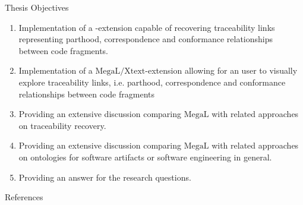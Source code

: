\documentclass{beamer}
\newcommand{\megal}{\text{MegaL}}
\newcommand{\megalxtext}{\text{MegaL/Xtext}}
\begin{document}
\begin{frame}{Thesis Objectives}
\small
\begin{enumerate}[TO1]
\item
Implementation of a \megalxtext-extension capable of recovering traceability links representing parthood, correspondence and conformance relationships between code fragments.

\item
Implementation of a $\megalxtext$-extension allowing for an user to visually explore traceability links, i.e. parthood, correspondence and conformance relationships between code fragments

\item
Providing an extensive discussion comparing $\megal$ with related approaches on traceability recovery.

\item
Providing an extensive discussion comparing $\megal$ with related approaches on ontologies for software artifacts or software engineering in general.

\item
Providing an answer for the research questions.
\end{enumerate}
\end{frame}

\begin{frame}[allowframebreaks]{References}
\scriptsize{}
{}
\end{frame}
\end{document}
